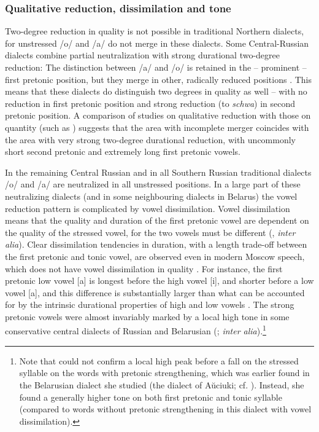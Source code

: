 \documentclass[output=paper,colorlinks,citecolor=black]{langscibook}
\begin{document}
\subsubsection{Qualitative reduction, dissimilation and tone}\label{post:subsec:dissimilation}
\largerpage[-2]
Two-degree reduction in quality is not possible in traditional Northern dialects, for unstressed /o/ and /a/ do not merge in these dialects. Some Central-Russian dialects combine partial neutralization with strong durational two-degree reduction: The distinction between /a/ and /o/ is retained in the -- prominent -- first pretonic position, but they merge in other, radically reduced positions \citep[cf.][]{AvanesovEtAl1986}. This means that these dialects do distinguish two degrees in quality as well -- with no reduction in first pretonic position and strong reduction (to \textit{schwa}) in second pretonic position. A comparison of studies on qualitative reduction \citep[e.g.][]{AvanesovEtAl1986} with those on quantity (such as \citealt{Vysotskij1973}) suggests that the area with incomplete merger coincides with the area with very strong two-degree durational reduction, with uncommonly short second pretonic and extremely long first pretonic vowels. 

In the remaining Central Russian and in all Southern Russian traditional dialects /o/ and /a/ are neutralized in all unstressed positions. In a large part of these neutralizing dialects (and in some neighbouring dialects in Belarus) the vowel reduction pattern is complicated by vowel dissimilation. Vowel dissimilation means that the quality and duration of the first pretonic vowel are dependent on the quality of the stressed vowel, for the two vowels must be different (\citealt{AvanesovEtAl1986}, \textit{inter alia}). Clear dissimilation tendencies in duration, with a length trade-off between the first pretonic and tonic vowel, are observed even in modern Moscow speech, which does not have vowel dissimilation in quality \citep{Kasatkina2005}. For instance, the first pretonic low vowel [a] is longest before the high vowel [i], and shorter before a low vowel [a], and this difference is substantially larger than what can be accounted for by the intrinsic durational properties of high and low vowels \citep{Zlatoustova1981,Kasatkina2005,Iosad2012}. The strong pretonic vowels were almost invariably marked by a local high tone in some conservative central dialects of Russian and Belarusian (\citealt{Broch1916,Bethin2006}; \textit{inter alia}).\footnote{Note that \citet{Borise2017} could not confirm a local high peak before a fall on the stressed syllable on the words with pretonic strengthening, which was earlier found in the Belarusian dialect she studied (the dialect of Aŭciuki; cf. \citealt{Bethin2006}). Instead, she found a generally higher tone on both first pretonic and tonic syllable (compared to words without pretonic strengthening in this dialect with vowel dissimilation).}
\end{document}
